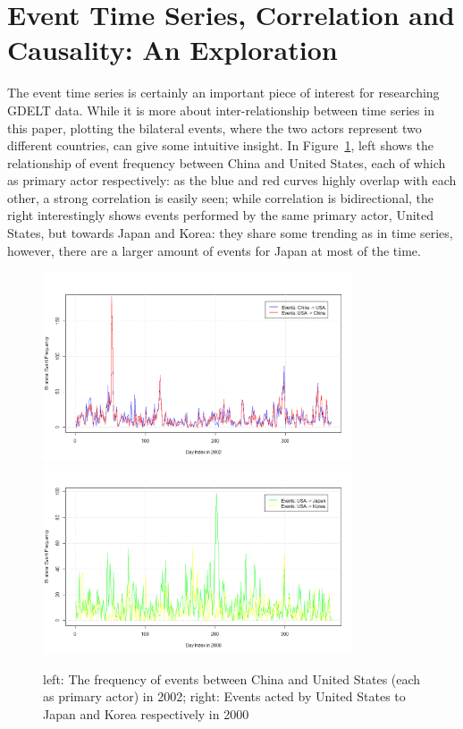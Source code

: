 \documentclass[runningheads,a4paper]{llncs}
\begin{document}
\section{Event Time Series, Correlation and Causality: An Exploration}
\label{exploration}

The event time series is certainly an important piece of interest for researching GDELT data. While it is more about inter-relationship between time series in this paper, plotting the bilateral events, where the two actors represent two different countries, can give some intuitive insight. In Figure~\ref{fig:1},  left shows the relationship of event frequency between China and United States, each of which as primary actor respectively: as the blue and red curves highly overlap with each other, a strong correlation is easily seen; while correlation is bidirectional, the right interestingly shows events performed by the same primary actor, United States, but towards Japan and Korea: they share some trending as in time series, however, there are a larger amount of events for Japan at most of the time. 

\begin{figure}[!htb]
\centering
{}
\includegraphics[width=\linewidth, height=2.2in]{sinousfreq}
\endminipage\hfill
{}
\includegraphics[width=\linewidth, height=2.2in]{usajpnkorfreq}
\endminipage\hfill
\label{fig:1}
\caption{left: The frequency of events between China and United States (each as primary actor) in 2002; right: Events acted by United States to Japan and Korea respectively in 2000}
\end{figure} 
\end{document}
